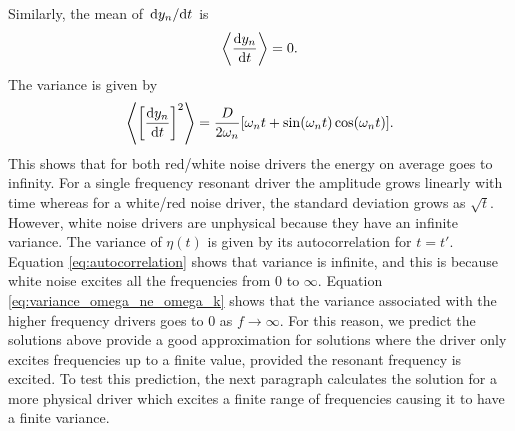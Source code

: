 Similarly, the mean of $\dv*{y_n}{t}$ is 
\begin{equation}
    \left\langle \dv{y_n}{t} \right\rangle=0.
\end{equation}
The variance is given by
\begin{equation}
    \left\langle \qty[\dv{y_n}{t}]^2 \right\rangle=\frac{D}{2\omega_n}[\omega_n t + \sin(\omega_n t) \cos(\omega_n t)].
\end{equation}
This shows that for both red/white noise drivers the energy on average goes to infinity. For a single frequency resonant driver the amplitude grows linearly with time whereas for a white/red noise driver, the standard deviation grows as $\sqrt{t}$. However, white noise drivers are unphysical because they have an infinite variance. The variance of $\eta(t)$ is given by its autocorrelation for $t=t'$. Equation \eqref{eq:autocorrelation} shows that variance is infinite, and this is because white noise excites all the frequencies from $0$ to $\infty$. Equation \eqref{eq:variance_omega_ne_omega_k} shows that the variance associated with the higher frequency drivers goes to $0$ as $f\rightarrow\infty$. For this reason, we predict the solutions above provide a good approximation for solutions where the driver only excites frequencies up to a finite value, provided the resonant frequency is excited. To test this prediction, the next paragraph calculates the solution for a more physical driver which excites a finite range of frequencies causing it to have a finite variance.

